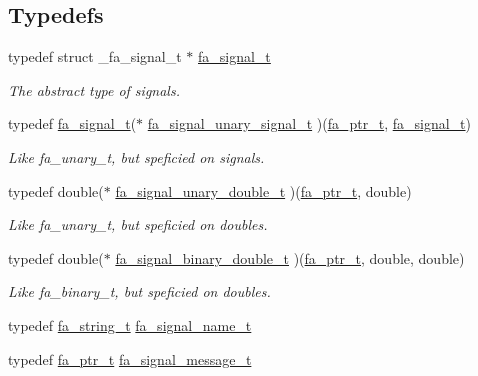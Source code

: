 \subsection*{Typedefs}
\begin{DoxyCompactItemize}
\item 
typedef struct \-\_\-fa\-\_\-signal\-\_\-t $\ast$ \hyperlink{group___fa_signal_gac5c72f160cd6e93a6783551627b166e5}{fa\-\_\-signal\-\_\-t}
\begin{DoxyCompactList}\small\item\em The abstract type of signals. \end{DoxyCompactList}\item 
typedef \hyperlink{group___fa_signal_gac5c72f160cd6e93a6783551627b166e5}{fa\-\_\-signal\-\_\-t}($\ast$ \hyperlink{group___fa_signal_gaa1f5df5ce102da5b837ccfee4632c7b4}{fa\-\_\-signal\-\_\-unary\-\_\-signal\-\_\-t} )(\hyperlink{group___fa_ga915ddeae99ad7568b273d2b876425197}{fa\-\_\-ptr\-\_\-t}, \hyperlink{group___fa_signal_gac5c72f160cd6e93a6783551627b166e5}{fa\-\_\-signal\-\_\-t})
\begin{DoxyCompactList}\small\item\em Like fa\-\_\-unary\-\_\-t, but speficied on signals. \end{DoxyCompactList}\item 
typedef double($\ast$ \hyperlink{group___fa_signal_gaced7eb8d67eb2fe39927934c4abc7255}{fa\-\_\-signal\-\_\-unary\-\_\-double\-\_\-t} )(\hyperlink{group___fa_ga915ddeae99ad7568b273d2b876425197}{fa\-\_\-ptr\-\_\-t}, double)
\begin{DoxyCompactList}\small\item\em Like fa\-\_\-unary\-\_\-t, but speficied on doubles. \end{DoxyCompactList}\item 
typedef double($\ast$ \hyperlink{group___fa_signal_ga7593031729bc7c15d5da9a06ce3eaf4a}{fa\-\_\-signal\-\_\-binary\-\_\-double\-\_\-t} )(\hyperlink{group___fa_ga915ddeae99ad7568b273d2b876425197}{fa\-\_\-ptr\-\_\-t}, double, double)
\begin{DoxyCompactList}\small\item\em Like fa\-\_\-binary\-\_\-t, but speficied on doubles. \end{DoxyCompactList}\item 
typedef \hyperlink{group___fa_string_gacada63033b77bc6c39fa632ae199349b}{fa\-\_\-string\-\_\-t} \hyperlink{group___fa_signal_gabb3471c5e8fbc3ab8657964de4200d37}{fa\-\_\-signal\-\_\-name\-\_\-t}
\item 
typedef \hyperlink{group___fa_ga915ddeae99ad7568b273d2b876425197}{fa\-\_\-ptr\-\_\-t} \hyperlink{group___fa_signal_ga655db48baa224e32e8fc00f33179b46e}{fa\-\_\-signal\-\_\-message\-\_\-t}
\end{DoxyCompactItemize}
